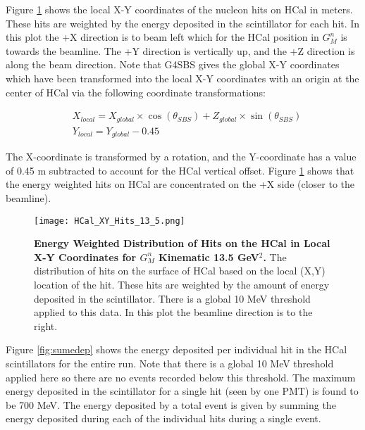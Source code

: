 \documentclass[10pt]{article}
\begin{document}
	Figure \ref{fig:xy_hits} shows the local X-Y coordinates of the nucleon hits on HCal in meters. These hits are weighted by the energy deposited in the scintillator for each hit. In this plot the +X direction is to beam left which for the HCal position in $G_M^n$ is towards the beamline. The +Y direction is vertically up, and the +Z direction is along the beam direction. Note that G4SBS gives the global X-Y coordinates which have been transformed into the local X-Y coordinates with an origin at the center of HCal via the following coordinate transformations:
	
	\begin{align}
		&X_{local} = X_{global}\times\cos\left(\theta_{SBS}\right) + Z_{global}\times\sin\left(\theta_{SBS}\right) \\
		&Y_{local} = Y_{global} - 0.45
	\end{align}
	
	\noindent The X-coordinate is transformed by a rotation, and the Y-coordinate has a value of 0.45 m subtracted to account for the HCal vertical offset. Figure \ref{fig:xy_hits} shows that the energy weighted hits on HCal are concentrated on the +X side (closer to the beamline).  
	\vspace{3mm}
	
	\begin{figure}[!ht]
	\begin{center}
	\texttt{[image: HCal\_XY\_Hits\_13\_5.png]}
	\end{center}
	\caption{
	{\bf{Energy Weighted Distribution of Hits on the HCal in Local X-Y Coordinates for $G_M^n$ Kinematic 13.5 GeV$^2$.}} The distribution of hits on the surface of HCal based on the local (X,Y) location of the hit. These hits are weighted by the amount of energy deposited in the scintillator. There is a global 10 MeV threshold applied to this data. In this plot the beamline direction is to the right.}
	\label{fig:xy_hits}
	\end{figure}	
	
	Figure \ref{fig:sumedep} shows the energy deposited per individual hit in the HCal scintillators for the entire run. Note that there is a global 10 MeV threshold applied here so there are no events recorded below this threshold. The maximum energy deposited in the scintillator for a single hit (seen by one PMT) is found to be 700 MeV. The energy deposited by a total event is given by summing the energy deposited during each of the individual hits during a single event.
	\vspace{3mm}
	
\end{document}
